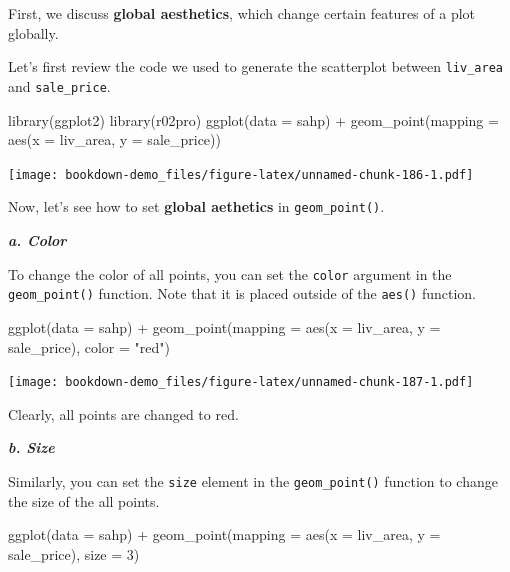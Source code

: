 \documentclass[
]{book}
\newenvironment{Shaded}{\begin{snugshade}}{\end{snugshade}}
\newcommand{\AttributeTok}[1]{\textcolor[rgb]{0.77,0.63,0.00}{#1}}
\newcommand{\DecValTok}[1]{\textcolor[rgb]{0.00,0.00,0.81}{#1}}
\newcommand{\FunctionTok}[1]{\textcolor[rgb]{0.00,0.00,0.00}{#1}}
\newcommand{\NormalTok}[1]{#1}
\newcommand{\SpecialCharTok}[1]{\textcolor[rgb]{0.00,0.00,0.00}{#1}}
\newcommand{\StringTok}[1]{\textcolor[rgb]{0.31,0.60,0.02}{#1}}
\begin{document}
First, we discuss \textbf{global aesthetics}, which change certain features of a plot globally.

Let's first review the code we used to generate the scatterplot between \texttt{liv\_area} and \texttt{sale\_price}.

\begin{Shaded}
\begin{Highlighting}[]
\FunctionTok{library}\NormalTok{(ggplot2)}
\FunctionTok{library}\NormalTok{(r02pro)}
\FunctionTok{ggplot}\NormalTok{(}\AttributeTok{data =}\NormalTok{ sahp) }\SpecialCharTok{+} \FunctionTok{geom\_point}\NormalTok{(}\AttributeTok{mapping =} \FunctionTok{aes}\NormalTok{(}\AttributeTok{x =}\NormalTok{ liv\_area, }\AttributeTok{y =}\NormalTok{ sale\_price))}
\end{Highlighting}
\end{Shaded}

\texttt{[image: bookdown-demo\_files/figure-latex/unnamed-chunk-186-1.pdf]}

Now, let's see how to set \textbf{global aethetics} in \texttt{geom\_point()}.

\textbf{\emph{a. Color}}

To change the color of all points, you can set the \texttt{color} argument in the \texttt{geom\_point()} function. Note that it is placed outside of the \texttt{aes()} function.

\begin{Shaded}
\begin{Highlighting}[]
\FunctionTok{ggplot}\NormalTok{(}\AttributeTok{data =}\NormalTok{ sahp) }\SpecialCharTok{+} \FunctionTok{geom\_point}\NormalTok{(}\AttributeTok{mapping =} \FunctionTok{aes}\NormalTok{(}\AttributeTok{x =}\NormalTok{ liv\_area, }\AttributeTok{y =}\NormalTok{ sale\_price), }\AttributeTok{color =} \StringTok{"red"}\NormalTok{)}
\end{Highlighting}
\end{Shaded}

\texttt{[image: bookdown-demo\_files/figure-latex/unnamed-chunk-187-1.pdf]}

Clearly, all points are changed to red.

\textbf{\emph{b. Size}}

Similarly, you can set the \texttt{size} element in the \texttt{geom\_point()} function to change the size of the all points.

\begin{Shaded}
\begin{Highlighting}[]
\FunctionTok{ggplot}\NormalTok{(}\AttributeTok{data =}\NormalTok{ sahp) }\SpecialCharTok{+} \FunctionTok{geom\_point}\NormalTok{(}\AttributeTok{mapping =} \FunctionTok{aes}\NormalTok{(}\AttributeTok{x =}\NormalTok{ liv\_area, }\AttributeTok{y =}\NormalTok{ sale\_price), }\AttributeTok{size =} \DecValTok{3}\NormalTok{)}
\end{Highlighting}
\end{Shaded}
\end{document}
